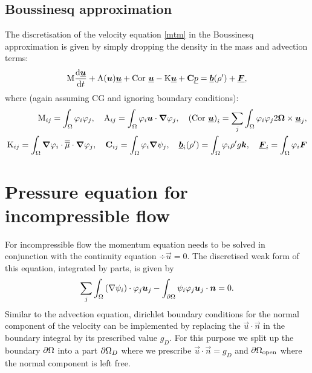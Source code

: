 \subsection{Boussinesq approximation}
The discretisation of the velocity equation \eqref{mtm} 
in the Boussinesq approximation is given by simply 
dropping the density in the mass and advection terms:
\begin{equation*}
  \mathrm{M} \frac{\mathrm{d}\underline{{\mbox{\boldmath$u$}}}}{\mathrm{d} t}
    +\mathrm{A}({\mbox{\boldmath$u$}})\underline{{\mbox{\boldmath$u$}}}
    +\mathrm{Cor}~\underline{{\mbox{\boldmath$u$}}}
    -\mathrm{K}\underline{{\mbox{\boldmath$u$}}}    
    +{\mbox{\boldmath$\mathrm{C}$}} \underline{p}
    =\underline{{\mbox{\boldmath$b$}}}(\rho')+\underline{{\mbox{\boldmath$F$}}},
\end{equation*}
where (again assuming CG and ignoring boundary conditions):
\begin{equation*}
\begin{split}
  \mathrm{M}_{ij}=\int_\Omega \varphi_i\varphi_j, \quad
  \mathrm{A}_{ij}=\int_\Omega \varphi_i{\mbox{\boldmath$u$}}\cdot{\mbox{\boldmath$\nabla$}} \varphi_j, \quad
  \left(\mathrm{Cor}~\underline{{\mbox{\boldmath$u$}}}\right)_i
    =\sum_j\int_\Omega \varphi_i \varphi_j 2{\mbox{\boldmath$\Omega$}}\times\underline{{\mbox{\boldmath$u$}}}_j, \\
  \mathrm{K}_{ij}=\int_\Omega {\mbox{\boldmath$\nabla$}}\varphi_i\cdot \overline{\overline{\mu}}\cdot{\mbox{\boldmath$\nabla$}} \varphi_j, \quad
  {\mbox{\boldmath$\mathrm{C}$}}_{ij}=\int_\Omega \varphi_i{\mbox{\boldmath$\nabla$}}\psi_j, \quad
    \underline{{\mbox{\boldmath$b$}}}_i(\rho')=\int_\Omega \varphi_i\rho'g{\mbox{\boldmath$k$}},\quad
    \underline{{\mbox{\boldmath$F$}}}_i=\int_\Omega \varphi_i{\mbox{\boldmath$F$}}
\end{split}
\end{equation*}

\section{Pressure equation for incompressible flow}
For incompressible flow the momentum equation needs to be solved 
in conjunction with the continuity equation 
$\div\vec u=0$. The discretised weak form of 
this equation, integrated by parts, is given by
\begin{equation*}
  \sum_j \int_\Omega \left(\nabla\psi_i\right)\cdot\varphi_j {\mbox{\boldmath$u$}}_j - 
    \int_{\partial\Omega} \psi_i\varphi_j {\mbox{\boldmath$u$}}_j\cdot{\mbox{\boldmath$n$}} = 0.
\end{equation*}
Similar to the advection equation, dirichlet boundary conditions for the 
normal component of the velocity can be implemented by replacing
the $\vec u\cdot\vec n$ in the boundary integral by its prescribed 
value $g_D$. For this purpose we split up the 
boundary ${\partial\Omega}$ into a part
${\partial\Omega}_D$ where we prescribe $\vec u\cdot\vec n=g_D$ and 
${\partial\Omega}_{\mathrm{open}}$ where the normal component is left free.


